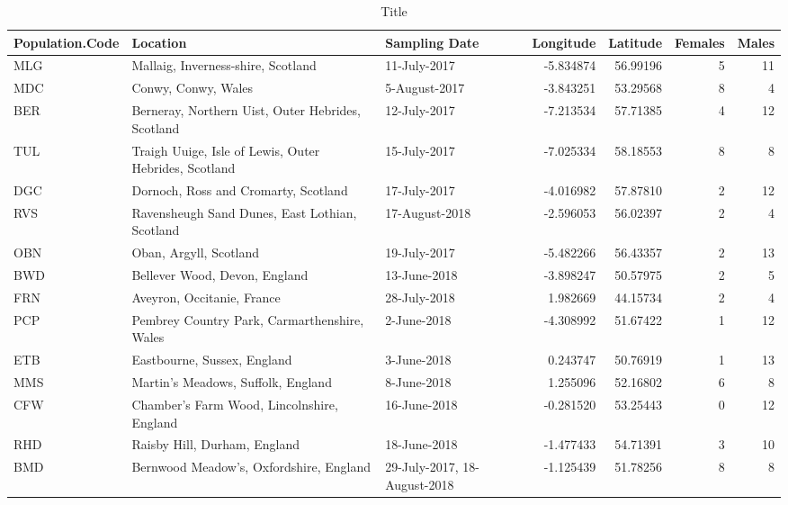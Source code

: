 \documentclass[12pt,]{article}
\begin{document}
\begin{landscape}\begingroup\fontsize{9}{11}\selectfont

\begin{longtable}{lllrrrr}
\caption{\label{tab:Table S2}Title}\\
\toprule
\textbf{Population.Code} & \textbf{Location} & \textbf{Sampling Date} & \textbf{Longitude} & \textbf{Latitude} & \textbf{Females} & \textbf{Males}\\
\midrule
MLG & Mallaig, Inverness-shire, Scotland & 11-July-2017 & -5.834874 & 56.99196 & 5 & 11\\
MDC & Conwy, Conwy, Wales & 5-August-2017 & -3.843251 & 53.29568 & 8 & 4\\
BER & Berneray, Northern Uist, Outer Hebrides, Scotland & 12-July-2017 & -7.213534 & 57.71385 & 4 & 12\\
TUL & Traigh Uuige, Isle of Lewis, Outer Hebrides, Scotland & 15-July-2017 & -7.025334 & 58.18553 & 8 & 8\\
DGC & Dornoch, Ross and Cromarty, Scotland & 17-July-2017 & -4.016982 & 57.87810 & 2 & 12\\
\addlinespace
RVS & Ravensheugh Sand Dunes, East Lothian, Scotland & 17-August-2018 & -2.596053 & 56.02397 & 2 & 4\\
OBN & Oban, Argyll, Scotland & 19-July-2017 & -5.482266 & 56.43357 & 2 & 13\\
BWD & Bellever Wood, Devon, England & 13-June-2018 & -3.898247 & 50.57975 & 2 & 5\\
FRN & Aveyron, Occitanie, France & 28-July-2018 & 1.982669 & 44.15734 & 2 & 4\\
PCP & Pembrey Country Park, Carmarthenshire, Wales & 2-June-2018 & -4.308992 & 51.67422 & 1 & 12\\
\addlinespace
ETB & Eastbourne, Sussex, England & 3-June-2018 & 0.243747 & 50.76919 & 1 & 13\\
MMS & Martin’s Meadows, Suffolk, England & 8-June-2018 & 1.255096 & 52.16802 & 6 & 8\\
CFW & Chamber’s Farm Wood, Lincolnshire, England & 16-June-2018 & -0.281520 & 53.25443 & 0 & 12\\
RHD & Raisby Hill, Durham, England & 18-June-2018 & -1.477433 & 54.71391 & 3 & 10\\
BMD & Bernwood Meadow’s, Oxfordshire, England & 29-July-2017, 18-August-2018 & -1.125439 & 51.78256 & 8 & 8\\
\bottomrule
\end{longtable}
\endgroup{}
\end{landscape}
\end{document}
